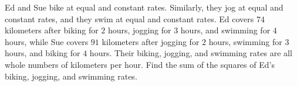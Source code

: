 Ed and Sue bike at equal and constant rates. Similarly, they jog at equal and constant rates, and they swim at equal and constant rates. Ed covers $74$ kilometers after biking for $2$ hours, jogging for $3$ hours, and swimming for $4$ hours, while Sue covers $91$ kilometers after jogging for $2$ hours, swimming for $3$ hours, and biking for $4$ hours. Their biking, jogging, and swimming rates are all whole numbers of kilometers per hour. Find the sum of the squares of Ed's biking, jogging, and swimming rates.
